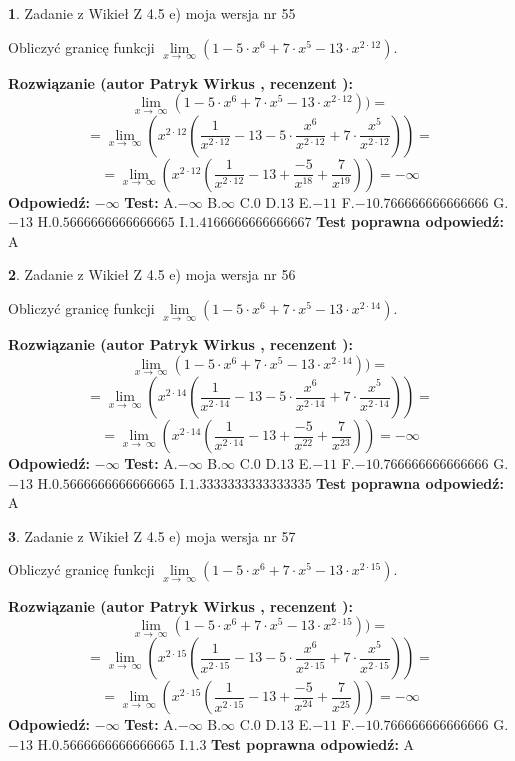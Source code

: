 \documentclass[12pt, a4paper]{article}
\theoremstyle{definition} %
\newtheorem{zad}{}
\newcommand{\zadStart}[1]{\begin{zad}#1\newline}
\newcommand{\zadStop}{\end{zad}}
\newcommand{\rozwStart}[2]{\noindent \textbf{Rozwiązanie (autor #1 , recenzent #2): }\newline}
\newcommand{\rozwStop}{\newline}
\newcommand{\odpStart}{\noindent \textbf{Odpowiedź:}\newline}
\newcommand{\odpStop}{\newline}
\newcommand{\testStart}{\noindent \textbf{Test:}\newline}
\newcommand{\testStop}{\newline}
\newcommand{\kluczStart}{\noindent \textbf{Test poprawna odpowiedź:}\newline}
\newcommand{\kluczStop}{\newline}
\begin{document}
\zadStart{Zadanie z Wikieł Z 4.5 e) moja wersja nr 55}


Obliczyć granicę funkcji  $\lim\limits_{x\to\ \infty}(1 - 5 \cdot x^{6}+7 \cdot x^{5}- 13 \cdot x^{2\cdot12})$.
\zadStop
\rozwStart{Patryk Wirkus}{}
$$\lim\limits_{x\to\ \infty}(1 - 5 \cdot x^{6}+7 \cdot x^{5}- 13 \cdot x^{2\cdot12}))=$$
$$=\lim\limits_{x\to\ \infty}(x^{2\cdot12}(\frac{1}{x^{2\cdot12}}-13 -5 \cdot \frac{x^{6}}{x^{2\cdot12}}+7 \cdot \frac{x^{5}}{x^{2\cdot12}}))=$$
$$=\lim\limits_{x\to\ \infty}(x^{2\cdot12}(\frac{1}{x^{2\cdot12}}-13 + \frac{-5}{x^{18}}+ \frac{7}{x^{19}}))=-\infty$$
\rozwStop
\odpStart
$-\infty$
\odpStop
\testStart
A.$-\infty$ B.$\infty$ C.$0$ D.$13$ E.$-11$
F.$-10.766666666666666$ G.$-13$
H.$0.5666666666666665$
I.$1.4166666666666667$
\testStop
\kluczStart
A
\kluczStop



\zadStart{Zadanie z Wikieł Z 4.5 e) moja wersja nr 56}


Obliczyć granicę funkcji  $\lim\limits_{x\to\ \infty}(1 - 5 \cdot x^{6}+7 \cdot x^{5}- 13 \cdot x^{2\cdot14})$.
\zadStop
\rozwStart{Patryk Wirkus}{}
$$\lim\limits_{x\to\ \infty}(1 - 5 \cdot x^{6}+7 \cdot x^{5}- 13 \cdot x^{2\cdot14}))=$$
$$=\lim\limits_{x\to\ \infty}(x^{2\cdot14}(\frac{1}{x^{2\cdot14}}-13 -5 \cdot \frac{x^{6}}{x^{2\cdot14}}+7 \cdot \frac{x^{5}}{x^{2\cdot14}}))=$$
$$=\lim\limits_{x\to\ \infty}(x^{2\cdot14}(\frac{1}{x^{2\cdot14}}-13 + \frac{-5}{x^{22}}+ \frac{7}{x^{23}}))=-\infty$$
\rozwStop
\odpStart
$-\infty$
\odpStop
\testStart
A.$-\infty$ B.$\infty$ C.$0$ D.$13$ E.$-11$
F.$-10.766666666666666$ G.$-13$
H.$0.5666666666666665$
I.$1.3333333333333335$
\testStop
\kluczStart
A
\kluczStop



\zadStart{Zadanie z Wikieł Z 4.5 e) moja wersja nr 57}


Obliczyć granicę funkcji  $\lim\limits_{x\to\ \infty}(1 - 5 \cdot x^{6}+7 \cdot x^{5}- 13 \cdot x^{2\cdot15})$.
\zadStop
\rozwStart{Patryk Wirkus}{}
$$\lim\limits_{x\to\ \infty}(1 - 5 \cdot x^{6}+7 \cdot x^{5}- 13 \cdot x^{2\cdot15}))=$$
$$=\lim\limits_{x\to\ \infty}(x^{2\cdot15}(\frac{1}{x^{2\cdot15}}-13 -5 \cdot \frac{x^{6}}{x^{2\cdot15}}+7 \cdot \frac{x^{5}}{x^{2\cdot15}}))=$$
$$=\lim\limits_{x\to\ \infty}(x^{2\cdot15}(\frac{1}{x^{2\cdot15}}-13 + \frac{-5}{x^{24}}+ \frac{7}{x^{25}}))=-\infty$$
\rozwStop
\odpStart
$-\infty$
\odpStop
\testStart
A.$-\infty$ B.$\infty$ C.$0$ D.$13$ E.$-11$
F.$-10.766666666666666$ G.$-13$
H.$0.5666666666666665$
I.$1.3$
\testStop
\kluczStart
A
\kluczStop
\end{document}
